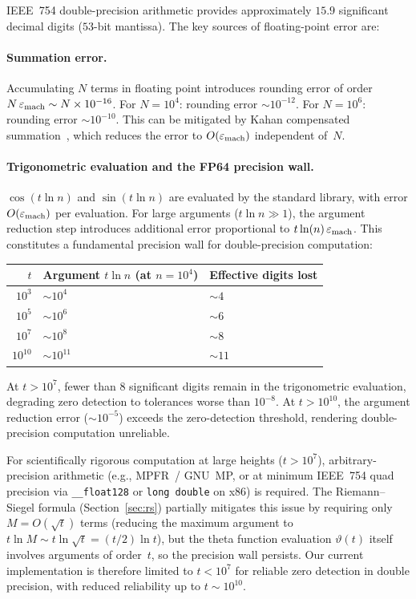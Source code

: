 IEEE~754 double-precision arithmetic provides approximately $15.9$ significant decimal
digits ($53$-bit mantissa). The key sources of floating-point error are:

\paragraph{Summation error.}
Accumulating $N$ terms in floating point introduces rounding error of order
$N\,\varepsilon_{\mathrm{mach}} \sim N \times 10^{-16}$. For $N = 10^4$: rounding error
$\sim 10^{-12}$. For $N = 10^6$: rounding error $\sim 10^{-10}$. This can be mitigated
by Kahan compensated summation~\cite{kahan1965}, which reduces the error to
$O(\varepsilon_{\mathrm{mach}})$ independent of~$N$.

\paragraph{Trigonometric evaluation and the FP64 precision wall.}
$\cos(t\ln n)$ and $\sin(t\ln n)$ are evaluated by the standard library, with error
$O(\varepsilon_{\mathrm{mach}})$ per evaluation. For large arguments ($t\ln n \gg 1$), the
argument reduction step introduces additional error proportional to
$t\ln(n)\,\varepsilon_{\mathrm{mach}}$. This constitutes a fundamental precision wall for
double-precision computation:
\begin{center}
\begin{tabular}{@{}rll@{}}
\toprule
$t$ & Argument $t\ln n$ (at $n = 10^4$) & Effective digits lost \\
\midrule
$10^3$ & $\sim 10^4$ & $\sim 4$ \\
$10^5$ & $\sim 10^6$ & $\sim 6$ \\
$10^7$ & $\sim 10^8$ & $\sim 8$ \\
$10^{10}$ & $\sim 10^{11}$ & $\sim 11$ \\
\bottomrule
\end{tabular}
\end{center}
At $t > 10^7$, fewer than $8$ significant digits remain in the trigonometric evaluation,
degrading zero detection to tolerances worse than $10^{-8}$. At $t > 10^{10}$, the
argument reduction error ($\sim 10^{-5}$) exceeds the zero-detection threshold, rendering
double-precision computation unreliable.

For scientifically rigorous computation at large heights ($t > 10^7$), arbitrary-precision
arithmetic (e.g., MPFR~/ GNU~MP, or at minimum IEEE~754 quad precision via
\texttt{\_\_float128} or \texttt{long double} on x86) is required. The Riemann--Siegel
formula (Section~\ref{sec:rs}) partially mitigates this issue by requiring only
$M = O(\sqrt{t})$ terms (reducing the maximum argument to
$t\ln M \sim t\ln\sqrt{t} = (t/2)\ln t$), but the theta function evaluation
$\vartheta(t)$ itself involves arguments of order~$t$, so the precision wall persists.
Our current implementation is therefore limited to $t < 10^7$ for reliable zero detection
in double precision, with reduced reliability up to $t \sim 10^{10}$.

